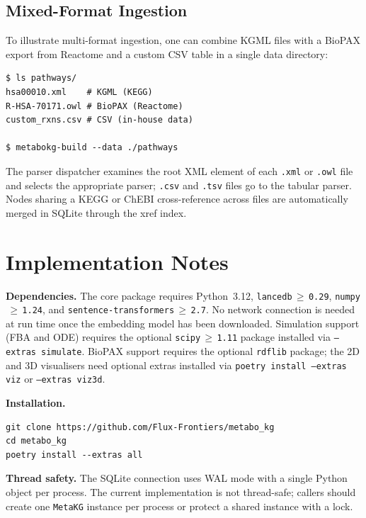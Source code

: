 \documentclass[10pt]{article}
\begin{document}
\subsection{Mixed-Format Ingestion}

To illustrate multi-format ingestion, one can combine KGML files with a
BioPAX export from Reactome and a custom CSV table in a single data directory:

\begin{lstlisting}[style=bash]
$ ls pathways/
hsa00010.xml    # KGML (KEGG)
R-HSA-70171.owl # BioPAX (Reactome)
custom_rxns.csv # CSV (in-house data)

$ metabokg-build --data ./pathways
\end{lstlisting}

The parser dispatcher examines the root XML element of each \texttt{.xml} or
\texttt{.owl} file and selects the appropriate parser; \texttt{.csv} and
\texttt{.tsv} files go to the tabular parser. Nodes sharing a KEGG or ChEBI
cross-reference across files are automatically merged in SQLite through the
xref index.

\section{Implementation Notes}
\label{sec:impl}

\textbf{Dependencies.} The core package requires Python~3.12,
\texttt{lancedb$\,\geq\,$0.29}, \texttt{numpy$\,\geq\,$1.24}, and
\texttt{sentence-transformers$\,\geq\,$2.7}. No network connection is needed
at run time once the embedding model has been downloaded. Simulation support
(FBA and ODE) requires the optional \texttt{scipy$\,\geq\,$1.11} package
installed via \texttt{--extras simulate}. BioPAX support requires the optional
\texttt{rdflib} package; the 2D and 3D visualisers need optional extras
installed via \texttt{poetry install --extras viz} or \texttt{--extras viz3d}.

\textbf{Installation.}

\begin{lstlisting}[style=bash]
git clone https://github.com/Flux-Frontiers/metabo_kg
cd metabo_kg
poetry install --extras all
\end{lstlisting}

\textbf{Thread safety.} The SQLite connection uses WAL mode with a single
Python object per process. The current implementation is not thread-safe;
callers should create one \texttt{MetaKG} instance per process or protect a
shared instance with a lock.
\end{document}
